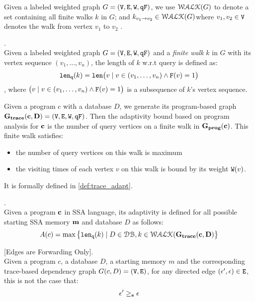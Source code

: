 %
Given a labeled weighted graph $G = (\mathtt{V}, \mathtt{E}, \mathtt{W}, \mathtt{qF})$, 
we use $\mathcal{WALK}(G)$ to denote a set containing all finite walks $k$ in $G$;
and $k_{v_1 \to v_2} \in \mathcal{WALK}(G)$where $v_1, v_2 \in \mathtt{V}$ denotes the walk from vertex $v_1$ to $v_2$ .
%
%
\begin{defn}.
\label{def:qlen}
\\
Given a labeled weighted graph $G = (\mathtt{V}, \mathtt{E}, \mathtt{W}, \mathtt{qF})$ and a \emph{finite walk} $k$ in $G$ with its vertex sequence $(v_1, \ldots, v_{n})$, the length of $k$ w.r.t query is defined as:
\[
  \mathtt{len}_{\tt q}(k) = \mathtt{len}\big(
  v \mid v \in (v_1, \ldots, v_{n}) \land \mathtt{F}(v) = 1 \big)
\]
, where $\big(v \mid v \in (v_1, \ldots, v_{n}) \land \mathtt{F}(v) = 1 \big)$ is a subsequence of $k$'s vertex sequence.
\end{defn}
%
Given a program $c$ with a database $D$, we generate its program-based graph 
$\bf{G_{trace}}({\boldsymbol{\mathbf{c}}}, D) = (\mathtt{V}, \mathtt{E}, \mathtt{W}, \mathtt{qF})$.
%
Then the adaptivity bound based on program analysis for ${\boldsymbol{\mathbf{c}}}$ is the number of query vertices on a finite walk in $\mathtt{\bf{G_{prog}}}({\boldsymbol{\mathbf{c}}})$. This finite walk satisfies:
%
\begin{itemize}
\item the number of query vertices on this walk is maximum
\item the visiting times of each vertex $v$ on this walk is bound by its weight $\mathtt{W}(v)$.
\end{itemize}
%
It is formally defined in \ref{def:trace_adapt}.
%
\begin{defn}
.
\label{def:trace_adapt}
\\
Given a program ${\boldsymbol{\mathbf{c}}}$ in SSA language, 
its adaptivity is defined for all possible starting SSA memory ${\boldsymbol{\mathbf{m}}}$ and database $D$ as follows:
%
$$
A(c) = \max \big 
\{ \mathtt{len}_{\tt q}(k) \mid D \in \mathcal{DB} , k \in \mathcal{WALK}(\bf{G_{trace}}(c, D) \big \} 
$$
\end{defn}
%
%
%
%
\begin{lem}
\label{lem:edgeforwarding}
[Edges are Forwarding Only].
\\
%
Given a program $c$, a database $D$, a starting memory $m$ and the corresponding trace-based dependency graph $G(c,D) = (\mathtt{V}, \mathtt{E})$, 
for any directed edge $(\mathtt{\epsilon}', \mathtt{\epsilon}) \in \mathtt{E}$, 
this is not the case that:
%
$$\mathtt{\epsilon}' \geq_{\mathtt{e}} \mathtt{\epsilon}$$
%
\end{lem}
